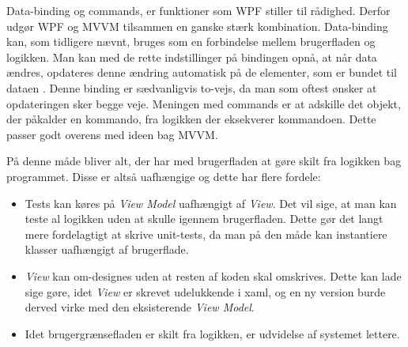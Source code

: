 Data-binding og commands, er  funktioner som WPF stiller til rådighed. Derfor udgør WPF og MVVM tilsammen en ganske stærk kombination. Data-binding kan, som tidligere nævnt, bruges som en forbindelse mellem brugerfladen og logikken. Man kan med de rette indstillinger på bindingen opnå, at når data ændres, opdateres denne ændring automatisk på de elementer, som er bundet til dataen \cite{msdn-databinding}. Denne binding er sædvanligvis to-vejs, da man som oftest ønsker at opdateringen sker begge veje. 
Meningen med commands er at adskille det objekt, der påkalder en kommando, fra logikken der eksekverer kommandoen. Dette passer godt overens med ideen bag MVVM. 

På denne måde bliver alt, der har med brugerfladen at gøre skilt fra logikken bag programmet. Disse er altså uafhængige og dette har flere fordele:

\begin{itemize}

\item {Tests kan køres på \textit{View Model} uafhængigt af \textit{View}.}
Det vil sige, at man kan teste al logikken uden at skulle igennem brugerfladen. Dette gør det langt mere fordelagtigt at skrive unit-tests, da man på den måde kan instantiere klasser uafhængigt af brugerflade.
\item{\textit{View} kan om-designes uden at resten af koden skal omskrives.}
Dette kan lade sige gøre, idet \textit{View} er skrevet udelukkende i xaml, og en ny version burde derved virke med den eksisterende \textit{View Model}.
\item{Idet brugergrænsefladen er skilt fra logikken, er udvidelse af systemet lettere.\cite{msdn1}}

\end{itemize}

